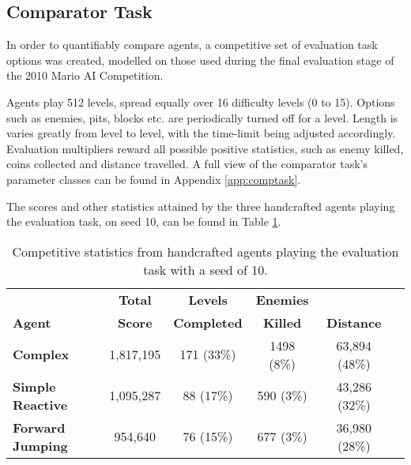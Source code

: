 
\subsection{Comparator Task}
\label{subsec:comptask}

In order to quantifiably compare agents, a competitive set of evaluation task options was created, modelled on those used during the final evaluation stage of the 2010 Mario AI Competition.

Agents play 512 levels, spread equally over 16 difficulty levels (0 to 15). Options such as enemies, pits, blocks etc. are periodically turned off for a level. Length is varies greatly from level to level, with the time-limit being adjusted accordingly. Evaluation multipliers reward all possible positive statistics, such as enemy killed, coins collected and distance travelled. A full view of the comparator task's parameter classes can be found in Appendix \ref{app:comptask}.

The scores and other statistics attained by the three handcrafted agents playing the evaluation task, on seed 10, can be found in Table \ref{tab:hceval}.

\begin{table}
  \begin{adjustwidth}{-0cm}{-0cm}
  \begin{center} \small
    \begin{tabular}{ | l | c | c | c | c | c |}
    \hline
    & \textbf{Total} & \textbf{Levels} & \textbf{Enemies} & \Tstrut \\
    \textbf{Agent} & \textbf{Score} & \textbf{Completed} & \textbf{Killed} & \textbf{Distance} \Bstrut \\ \thickhline
    \textbf{Complex} & 1,817,195 & 171 (33\%) & 1498 (8\%) & 63,894 (48\%) \\ \hline
    \textbf{Simple Reactive} & 1,095,287 & 88 (17\%) & 590 (3\%) & 43,286 (32\%) \\ \hline
    \textbf{Forward Jumping} & 954,640 & 76 (15\%) & 677 (3\%) & 36,980 (28\%) \\ \hline

    \end{tabular}
  \end{center}
  \end{adjustwidth}
  \caption{\small Competitive statistics from handcrafted agents playing the evaluation task with a seed of 10.}
  \label{tab:hceval}
\end{table}
